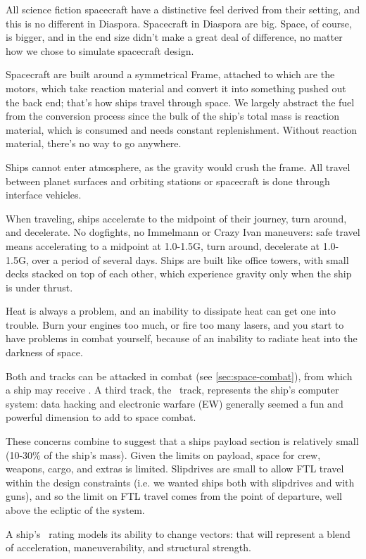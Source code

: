 \vfil

All science fiction spacecraft have a distinctive feel derived from their setting, and this is no different in Diaspora. Spacecraft in Diaspora are big. Space, of course, is bigger, and in the end size didn't make a great deal of difference, no matter how we chose to simulate spacecraft design.

Spacecraft are built around a symmetrical Frame, attached to which are the motors, which take reaction material and convert it into something pushed out the back end; that's how ships travel through space. We largely abstract the fuel from the conversion process since the bulk of the ship's total mass is reaction material, which is consumed and needs constant replenishment.  Without reaction material, there's no way to go anywhere.

Ships cannot enter atmosphere, as the gravity would crush the frame. All travel between planet surfaces and orbiting stations or spacecraft is done through interface vehicles.

When traveling, ships accelerate to the midpoint of their journey, turn around, and decelerate. No dogfights, no Immelmann or Crazy Ivan maneuvers: safe travel means accelerating to a midpoint at 1.0-1.5G, turn around, decelerate at 1.0-1.5G, over a period of several days. Ships are built like office towers, with small decks stacked on top of each other, which experience gravity only when the ship is under thrust.

Heat is always a problem, and an inability to dissipate heat can get one into trouble.  Burn your engines too much, or fire too many lasers, and you start to have problems in combat yourself, because of an inability to radiate heat into the darkness of space.


Both \Heat{} and \Frame{} tracks can be attacked in combat (see \autoref{sec:space-combat}), from which a ship may receive \Consequences. A third track, the \Data\ track, represents the ship's computer system: data hacking and electronic warfare (EW) generally seemed a fun and powerful dimension to add to space combat.

These concerns combine to suggest that a ships payload section is relatively small (10-30\% of the ship's mass). Given the limits on payload, space for crew, weapons, cargo, and extras is limited. Slipdrives are small to allow FTL travel within the design constraints (i.e. we wanted ships both with slipdrives and with guns), and so the limit on FTL travel comes from the point of departure, well above the ecliptic of the system.

A ship's \Vshift\ rating models its ability to change vectors: that will represent a blend of acceleration, maneuverability, and structural strength.

